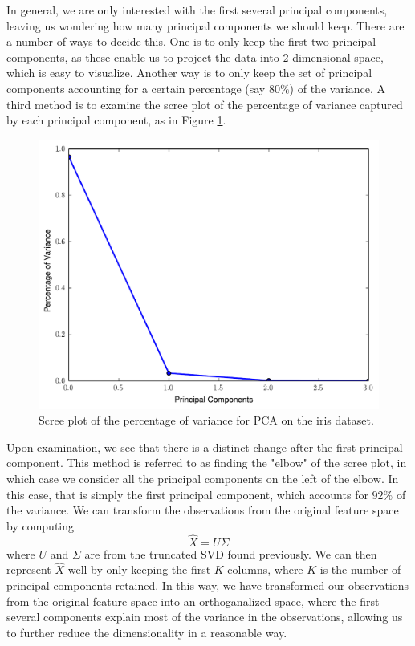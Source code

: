 In general, we are only interested with the first several principal components, leaving us wondering how many principal components we should keep. There are a number of ways to decide this. One is to only keep the first two principal components, as these enable us to project the data into $2$-dimensional space, which is easy to visualize. Another way is to only keep the set of principal components accounting for a certain percentage (say $80\%$) of the variance. A third method is to examine the scree plot of the percentage of variance captured by each principal component, as in Figure \ref{fig:iris_scree}.
\begin{figure}
\includegraphics[width=\textwidth]{iris_scree.pdf}
\caption{Scree plot of the percentage of variance for PCA on the iris dataset.}
\label{fig:iris_scree}
\end{figure}
Upon examination, we see that there is a distinct change after the first principal component. This method is referred to as finding the "elbow" of the scree plot, in which case we consider all the principal components on the left of the elbow. In this case, that is simply the first principal component, which accounts for $92\%$ of the variance.
We can transform the observations from the original feature space by computing 
\begin{equation*}
\widehat{X} = U\Sigma
\end{equation*}
where $U$ and $\Sigma$ are from the truncated SVD found previously. We can then represent $\widehat{X}$ well by only keeping the first $K$ columns, where $K$ is the number of principal components retained. In this way, we have transformed our observations from the original feature space into an orthoganalized space, where the first several components explain most of the variance in the observations, allowing us to further reduce the dimensionality in a reasonable way.

